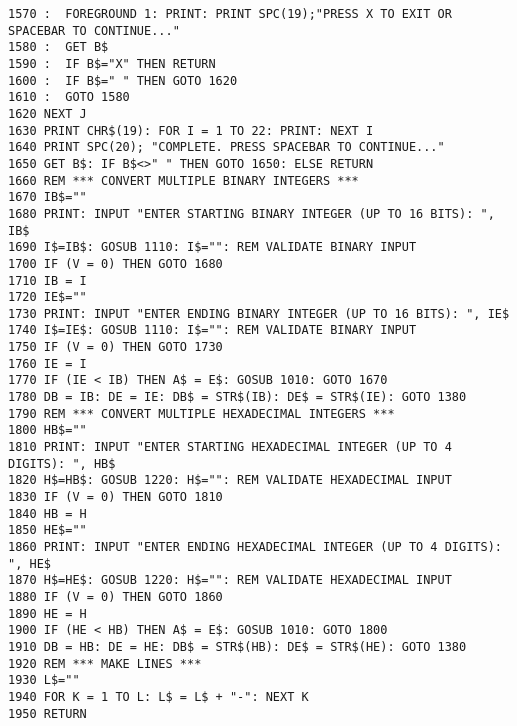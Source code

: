 \begin{tcolorbox}[colback=black,coltext=white]
\verbatimfont{\codefont}
\begin{verbatim}
1570 :  FOREGROUND 1: PRINT: PRINT SPC(19);"PRESS X TO EXIT OR SPACEBAR TO CONTINUE..."
1580 :  GET B$
1590 :  IF B$="X" THEN RETURN
1600 :  IF B$=" " THEN GOTO 1620
1610 :  GOTO 1580
1620 NEXT J
1630 PRINT CHR$(19): FOR I = 1 TO 22: PRINT: NEXT I
1640 PRINT SPC(20); "COMPLETE. PRESS SPACEBAR TO CONTINUE..."
1650 GET B$: IF B$<>" " THEN GOTO 1650: ELSE RETURN
1660 REM *** CONVERT MULTIPLE BINARY INTEGERS ***
1670 IB$=""
1680 PRINT: INPUT "ENTER STARTING BINARY INTEGER (UP TO 16 BITS): ", IB$
1690 I$=IB$: GOSUB 1110: I$="": REM VALIDATE BINARY INPUT
1700 IF (V = 0) THEN GOTO 1680
1710 IB = I
1720 IE$=""
1730 PRINT: INPUT "ENTER ENDING BINARY INTEGER (UP TO 16 BITS): ", IE$
1740 I$=IE$: GOSUB 1110: I$="": REM VALIDATE BINARY INPUT
1750 IF (V = 0) THEN GOTO 1730
1760 IE = I
1770 IF (IE < IB) THEN A$ = E$: GOSUB 1010: GOTO 1670
1780 DB = IB: DE = IE: DB$ = STR$(IB): DE$ = STR$(IE): GOTO 1380
1790 REM *** CONVERT MULTIPLE HEXADECIMAL INTEGERS ***
1800 HB$=""
1810 PRINT: INPUT "ENTER STARTING HEXADECIMAL INTEGER (UP TO 4 DIGITS): ", HB$
1820 H$=HB$: GOSUB 1220: H$="": REM VALIDATE HEXADECIMAL INPUT
1830 IF (V = 0) THEN GOTO 1810
1840 HB = H
1850 HE$=""
1860 PRINT: INPUT "ENTER ENDING HEXADECIMAL INTEGER (UP TO 4 DIGITS): ", HE$
1870 H$=HE$: GOSUB 1220: H$="": REM VALIDATE HEXADECIMAL INPUT
1880 IF (V = 0) THEN GOTO 1860
1890 HE = H
1900 IF (HE < HB) THEN A$ = E$: GOSUB 1010: GOTO 1800
1910 DB = HB: DE = HE: DB$ = STR$(HB): DE$ = STR$(HE): GOTO 1380
1920 REM *** MAKE LINES ***
1930 L$=""
1940 FOR K = 1 TO L: L$ = L$ + "-": NEXT K
1950 RETURN
\end{verbatim}
\end{tcolorbox}
